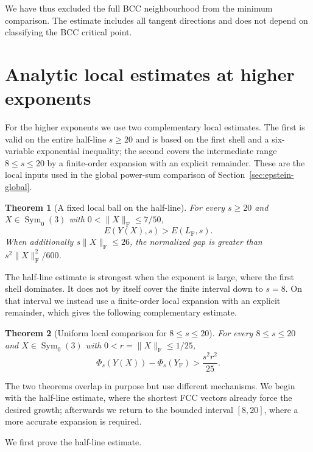 \documentclass[reqno,english]{amsart}
\newtheorem{theorem}{Theorem}[section]
\theoremstyle{definition}
\newtheorem{open problem}[theorem]{Open Problem}
\theoremstyle{remark}
\theoremstyle{plain}
\numberwithin{equation}{section}
\newcommand{\FCC}{L_{\mathrm F}}
\newcommand{\YF}{Y_{\mathrm F}}
\newcommand{\norm}[1]{\lVert#1\rVert_{\mathrm F}}
\newcommand{\Symzero}{\operatorname{Sym}_0(3)}
\begin{document}
We have thus excluded the full BCC neighbourhood from the minimum
comparison. The estimate includes all tangent directions and does
not depend on classifying the BCC critical point.

\section{Analytic local estimates at higher exponents}\label{sec:epstein-high-local}

For the higher exponents we use two complementary local estimates. The first is valid on the entire half-line $s\ge20$ and is based on the first shell and a six-variable exponential inequality; the second covers the intermediate range $8\le s\le20$ by a finite-order expansion with an explicit remainder. These are the local inputs used in the global power-sum comparison of Section~\ref{sec:epstein-global}.

\begin{theorem}[A fixed local ball on the half-line]\label{E:thm:local20}
For every $s\ge20$ and $X\in\Symzero$ with $0<\norm X\le7/50$,
\begin{equation}
 E(Y(X),s)>E(\FCC,s).
 \label{E:eq:local20}
\end{equation}
When additionally $s\norm X\le26$, the normalized gap is greater than
$s^2\norm X^2/600$.
\end{theorem}

The half-line estimate is strongest when the exponent is large, where the first shell dominates. It does not by itself cover the finite interval down to $s=8$. On that interval we instead use a finite-order local expansion with an explicit remainder, which gives the following complementary estimate.

\begin{theorem}[Uniform local comparison for $8\le s\le20$]\label{E:thm:local8}
For every $8\le s\le20$ and $X\in\Symzero$ with $0<r=\norm X\le1/25$,
\begin{equation}
 \Phi_s(Y(X))-\Phi_s(\YF)>\frac{s^2r^2}{25}.
 \label{E:eq:local8}
\end{equation}
\end{theorem}

The two theorems overlap in purpose but use different mechanisms. We begin with the half-line estimate, where the shortest FCC vectors already force the desired growth; afterwards we return to the bounded interval $[8,20]$, where a more accurate expansion is required.

We first prove the half-line estimate.
\end{document}
